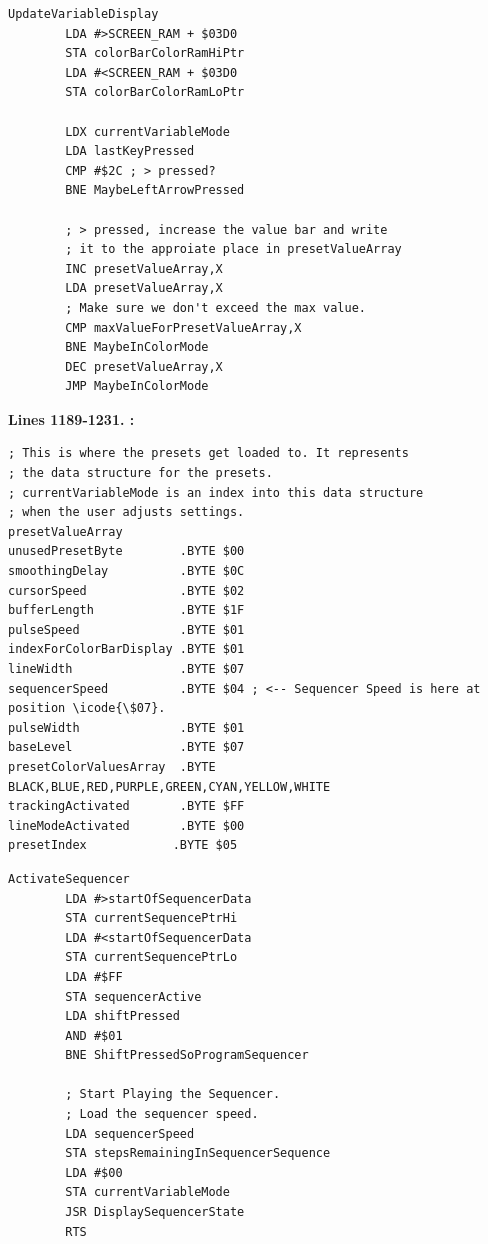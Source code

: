 \begin{lstlisting}[caption=From \icode{CheckKeyboardInputForActiveVariable}. Pressing the < and > keys increments and
decrements the value in presetValueArray pointed to by \icode{X}\, i.e. \icode{currentVariableMode}.]
UpdateVariableDisplay   
        LDA #>SCREEN_RAM + $03D0
        STA colorBarColorRamHiPtr
        LDA #<SCREEN_RAM + $03D0
        STA colorBarColorRamLoPtr

        LDX currentVariableMode
        LDA lastKeyPressed
        CMP #$2C ; > pressed?
        BNE MaybeLeftArrowPressed

        ; > pressed, increase the value bar and write
        ; it to the approiate place in presetValueArray
        INC presetValueArray,X
        LDA presetValueArray,X
        ; Make sure we don't exceed the max value.
        CMP maxValueForPresetValueArray,X
        BNE MaybeInColorMode
        DEC presetValueArray,X
        JMP MaybeInColorMode
\end{lstlisting}

\clearpage

\textbf{Lines 1189-1231. :} 
\clearpage

\begin{lstlisting}[basicstyle=\ttfamily\scriptsize]
; This is where the presets get loaded to. It represents
; the data structure for the presets.
; currentVariableMode is an index into this data structure
; when the user adjusts settings.
presetValueArray
unusedPresetByte        .BYTE $00
smoothingDelay          .BYTE $0C
cursorSpeed             .BYTE $02
bufferLength            .BYTE $1F
pulseSpeed              .BYTE $01
indexForColorBarDisplay .BYTE $01
lineWidth               .BYTE $07
sequencerSpeed          .BYTE $04 ; <-- Sequencer Speed is here at position \icode{\$07}.
pulseWidth              .BYTE $01
baseLevel               .BYTE $07
presetColorValuesArray  .BYTE BLACK,BLUE,RED,PURPLE,GREEN,CYAN,YELLOW,WHITE
trackingActivated       .BYTE $FF
lineModeActivated       .BYTE $00
presetIndex            .BYTE $05
\end{lstlisting}

\begin{lstlisting}[basicstyle=\ttfamily\scriptsize]
ActivateSequencer 
        LDA #>startOfSequencerData
        STA currentSequencePtrHi
        LDA #<startOfSequencerData
        STA currentSequencePtrLo
        LDA #$FF
        STA sequencerActive
        LDA shiftPressed
        AND #$01
        BNE ShiftPressedSoProgramSequencer

        ; Start Playing the Sequencer.
        ; Load the sequencer speed.
        LDA sequencerSpeed
        STA stepsRemainingInSequencerSequence
        LDA #$00
        STA currentVariableMode
        JSR DisplaySequencerState
        RTS 
\end{lstlisting}


